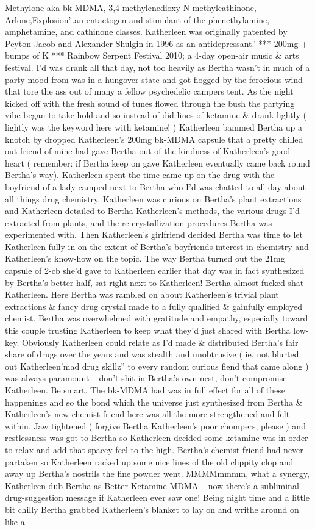 \documentclass[12pt]{book}
\begin{document}
Methylone aka bk-MDMA, 3,4-methylenedioxy-N-methylcathinone, Arlone,Explosion'..an entactogen and stimulant of the phenethylamine, amphetamine, and cathinone classes. Katherleen was originally patented by Peyton Jacob and Alexander Shulgin in 1996 as an antidepressant.' *** 200mg + bumps of K *** Rainbow Serpent Festival 2010; a 4-day open-air music \& arts festival. I'd was drank all that day, not too heavily as Bertha wasn't in much of a party mood from was in a hungover state and got flogged by the ferocious wind that tore the ass out of many a fellow psychedelic campers tent. As the night kicked off with the fresh sound of tunes flowed through the bush the partying vibe began to take hold and so instead of did lines of ketamine \& drank lightly ( lightly was the keyword here with ketamine! ) Katherleen bammed Bertha up a knotch by dropped Katherleen's 200mg bk-MDMA capsule that a pretty chilled out friend of mine had gave Bertha out of the kindness of Katherleen's good heart ( remember: if Bertha keep on gave Katherleen eventually came back round Bertha's way). Katherleen spent the time came up on the drug with the boyfriend of a lady camped next to Bertha who I'd was chatted to all day about all things drug chemistry. Katherleen was curious on Bertha's plant extractions and Katherleen detailed to Bertha Katherleen's methods, the various drugs I'd extracted from plants, and the re-crystallization procedures Bertha was experimented with. Then Katherleen's girlfriend decided Bertha was time to let Katherleen fully in on the extent of Bertha's boyfriends interest in chemistry and Katherleen's know-how on the topic. The way Bertha turned out the 21mg capsule of 2-cb she'd gave to Katherleen earlier that day was in fact synthesized by Bertha's better half, sat right next to Katherleen! Bertha almost fucked shat Katherleen. Here Bertha was rambled on about Katherleen's trivial plant extractions \& fancy drug crystal made to a fully qualified \& gainfully employed chemist. Bertha was overwhelmed with gratitude and empathy, especially toward this couple trusting Katherleen to keep what they'd just shared with Bertha low-key. Obviously Katherleen could relate as I'd made \& distributed Bertha's fair share of drugs over the years and was stealth and unobtrusive ( ie, not blurted out Katherleen'mad drug skillz'' to every random curious fiend that came along ) was always paramount -- don't shit in Bertha's own nest, don't compromise Katherleen. Be smart. The bk-MDMA had was in full effect for all of these happenings and so the bond which the universe just synthesized from Bertha \& Katherleen's new chemist friend here was all the more strengthened and felt within. Jaw tightened ( forgive Bertha Katherleen's poor chompers, please ) and restlessness was got to Bertha so Katherleen decided some ketamine was in order to relax and add that spacey feel to the high. Bertha's chemist friend had never partaken so Katherleen racked up some nice lines of the old clippity clop and away up Bertha's nostrils the fine powder went. MMMMmmmm, what a synergy, Katherleen dub Bertha as Better-Ketamine-MDMA -- now there's a subliminal drug-suggestion message if Katherleen ever saw one! Being night time and a little bit chilly Bertha grabbed Katherleen's blanket to lay on and writhe around on like a 
\end{document}
